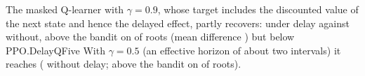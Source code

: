 The masked Q-learner with $\gamma=0.9$, whose target includes the discounted
value of the next state and hence the delayed effect, partly recovers:
\DelayQNine{} under delay against \DelayQNineLZero{} without, above the bandit
on \DelayQNineRootsBetter{} of \DelayQNineRoots{} roots (mean difference
\DelayQNineVs) but below PPO.\ifcsname DelayQFive\endcsname{} With $\gamma=0.5$
(an effective horizon of about two intervals) it reaches \DelayQFive{}
(\DelayQFiveLZero{} without delay; above the bandit on
\DelayQFiveRootsBetter{} of \DelayQFiveRoots{} roots).\fi
